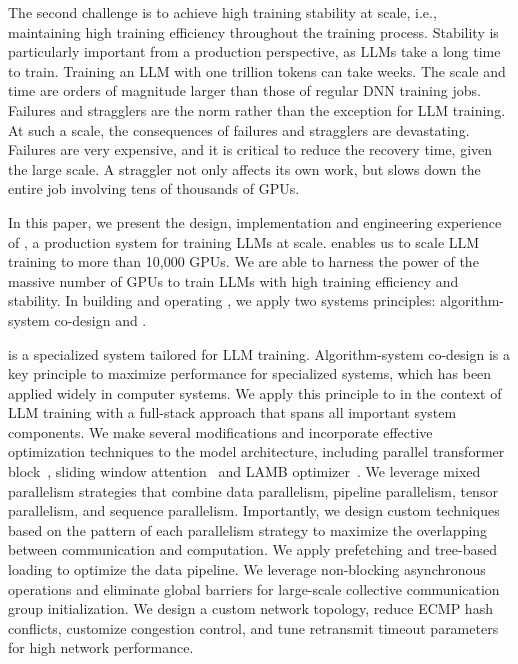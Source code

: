 The second challenge is to achieve high training stability at scale, i.e.,
maintaining high training efficiency throughout the training process. Stability
is particularly important from a production perspective, as LLMs take a long
time to train. Training an LLM with one trillion tokens can take weeks. The
scale and time are orders of magnitude larger than those of regular DNN training
jobs. Failures and stragglers are the norm rather than the exception for LLM
training. At such a scale, the consequences of failures and stragglers are
devastating. Failures are very expensive, and it is critical to reduce the
recovery time, given the large scale. A straggler not only affects its own work,
but slows down the entire job involving tens of thousands of GPUs. 

In this paper, we present the design, implementation and engineering experience
of \sysname, a production system for training LLMs at scale. \sysname enables us
to scale LLM training to more than 10,000 GPUs. We are able to harness the power
of the massive number of GPUs to train LLMs with high training efficiency and
stability. In building and operating \sysname, we apply two systems principles:
algorithm-system co-design and . 

\sysname is a specialized system tailored for LLM training. Algorithm-system
co-design is a key principle to maximize performance for specialized systems,
which has been applied widely in computer systems. We apply this
principle to \sysname in the context of LLM training with a full-stack approach
that spans all important system components. We make several modifications and
incorporate effective optimization techniques to the model architecture,
including parallel transformer block~\cite{chowdhery2022palm},
sliding window attention~\cite{beltagy2020longformer} and LAMB optimizer~\cite{You2020Large}. We leverage mixed parallelism strategies that combine data parallelism, pipeline parallelism, tensor
parallelism, and sequence parallelism. Importantly, we design custom techniques based
on the pattern of each parallelism strategy to maximize the overlapping between
communication and computation. We apply prefetching and
tree-based loading to optimize the data pipeline. We leverage non-blocking
asynchronous operations and eliminate global barriers for large-scale collective
communication group initialization. We design a custom network topology, reduce
ECMP hash conflicts, customize congestion control, and tune retransmit timeout
parameters for high network performance.

